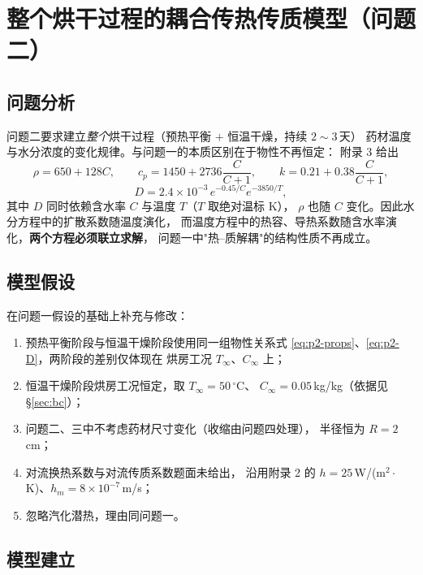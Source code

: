 \documentclass[12pt,a4paper]{ctexart}
\begin{document}
\section{整个烘干过程的耦合传热传质模型（问题二）}

\subsection{问题分析}

问题二要求建立\emph{整个}烘干过程（预热平衡 $+$ 恒温干燥，持续 $2\sim3$\,天）
药材温度与水分浓度的变化规律。与问题一的本质区别在于物性不再恒定：
附录 3 给出
\begin{equation}
  \rho=650+128C,\qquad
  c_p=1450+2736\frac{C}{C+1},\qquad
  k=0.21+0.38\frac{C}{C+1},
  \label{eq:p2-props}
\end{equation}
\begin{equation}
  D=2.4\times10^{-3}\,e^{-0.45/C}e^{-3850/T},
  \label{eq:p2-D}
\end{equation}
其中 $D$ 同时依赖含水率 $C$ 与温度 $T$（$T$ 取绝对温标 K），
$\rho$ 也随 $C$ 变化。因此水分方程中的扩散系数随温度演化，
而温度方程中的热容、导热系数随含水率演化，\textbf{两个方程必须联立求解}，
问题一中"热--质解耦"的结构性质不再成立。

\subsection{模型假设}

在问题一假设的基础上补充与修改：

\begin{enumerate}
  \item[(B1)] 预热平衡阶段与恒温干燥阶段使用同一组物性关系式
        \eqref{eq:p2-props}、\eqref{eq:p2-D}，两阶段的差别仅体现在
        烘房工况 $T_\infty$、$C_\infty$ 上；
  \item[(B2)] 恒温干燥阶段烘房工况恒定，取 $T_\infty=50\,^\circ$C、
        $C_\infty=0.05$\,kg/kg（依据见 §\ref{sec:bc}）；
  \item[(B3)] 问题二、三中不考虑药材尺寸变化（收缩由问题四处理），
        半径恒为 $R=2$\,cm；
  \item[(B4)] 对流换热系数与对流传质系数题面未给出，
        沿用附录 2 的 $h=25$\,W/(m$^2\cdot$K)、$h_m=8\times10^{-7}$\,m/s；
  \item[(B5)] 忽略汽化潜热，理由同问题一。
\end{enumerate}

\subsection{模型建立}
\end{document}
